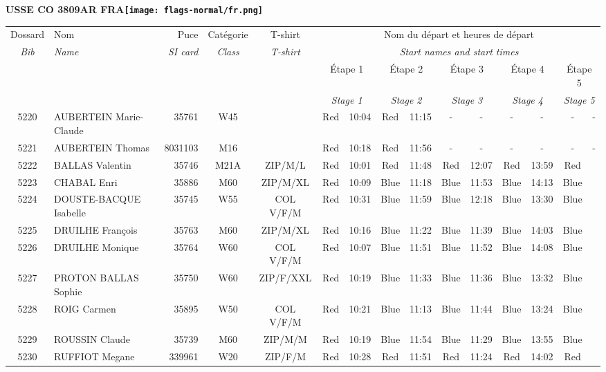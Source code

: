 \documentclass{report}
\begin{document}
\newpage
  \Huge \centering \bfseries USSE CO 3809AR FRA\normalfont \footnotesize \sffamily \hfill \texttt{[image: flags-normal/fr.png]} \newline 
  \begin{longtable}{|c|l|r|c|c|*{5}{cc|}}
    Dossard & Nom  & Puce    & Catégorie & T-shirt & \multicolumn{10}{c|}{Nom du départ et heures de départ} \\
    \itshape Bib     & \itshape Name & \itshape SI card & \itshape Class  & \itshape  T-shirt  & \multicolumn{10}{c|}{\itshape Start names and start times} \\
    \hline
    & & & & & \multicolumn{2}{c|}{Étape 1} & \multicolumn{2}{c|}{Étape 2} & \multicolumn{2}{c|}{Étape 3} & \multicolumn{2}{c|}{Étape 4} & \multicolumn{2}{c|}{Étape 5} \\
    & & & & & \multicolumn{2}{c|}{\itshape Stage 1} & \multicolumn{2}{c|}{\itshape Stage 2} & \multicolumn{2}{c|}{\itshape Stage 3} & \multicolumn{2}{c|}{\itshape Stage 4} & \multicolumn{2}{c|}{\itshape Stage 5} \\
    \hline
    5220 & AUBERTEIN Marie-Claude & 35761 & W45 &   & Red & 10:04 & Red & 11:15 & - &  - & - &  - & - &  -\\
    5221 & AUBERTEIN Thomas & 8031103 & M16 &   & Red & 10:18 & Red & 11:56 & - &  - & - &  - & - &  -\\
    5222 & BALLAS Valentin & 35746 & M21A & ZIP/M/L & Red & 10:01 & Red & 11:48 & Red & 12:07 & Red & 13:59 & Red &  \\
    5223 & CHABAL Enri & 35886 & M60 & ZIP/M/XL & Red & 10:09 & Blue & 11:18 & Blue & 11:53 & Blue & 14:13 & Blue &  \\
    5224 & DOUSTE-BACQUE Isabelle & 35745 & W55 & COL V/F/M & Red & 10:31 & Blue & 11:59 & Blue & 12:18 & Blue & 13:30 & Blue &  \\
    5225 & DRUILHE François & 35763 & M60 & ZIP/M/XL & Red & 10:16 & Blue & 11:22 & Blue & 11:39 & Blue & 14:03 & Blue &  \\
    5226 & DRUILHE Monique & 35764 & W60 & COL V/F/M & Red & 10:07 & Blue & 11:51 & Blue & 11:52 & Blue & 14:08 & Blue &  \\
    5227 & PROTON BALLAS Sophie & 35750 & W60 & ZIP/F/XXL & Red & 10:19 & Blue & 11:33 & Blue & 11:36 & Blue & 13:32 & Blue &  \\
    5228 & ROIG Carmen & 35895 & W50 & COL V/F/M & Red & 10:21 & Blue & 11:13 & Blue & 11:44 & Blue & 13:24 & Blue &  \\
    5229 & ROUSSIN Claude & 35739 & M60 & ZIP/M/M & Red & 10:19 & Blue & 11:54 & Blue & 11:29 & Blue & 13:55 & Blue &  \\
    5230 & RUFFIOT Megane & 339961 & W20 & ZIP/F/M & Red & 10:28 & Red & 11:51 & Red & 11:24 & Red & 14:02 & Red &  \\
  \end{longtable}
\end{document}
